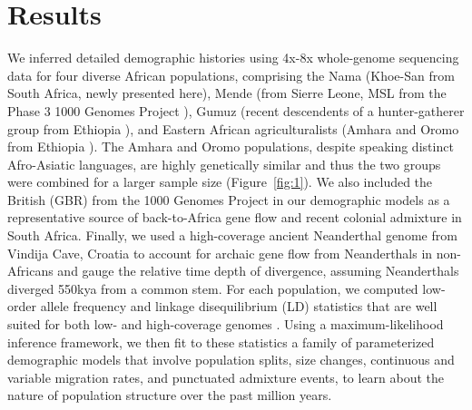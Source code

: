 \documentclass[]{article}
\begin{document}
\section*{Results}

We inferred detailed demographic histories using 4x-8x whole-genome sequencing
data for four diverse African populations, comprising the Nama (Khoe-San from
South Africa, newly presented here), Mende (from Sierre Leone, MSL from the
Phase 3 1000 Genomes Project \citep{1000_Genomes_Project_Consortium2015-zq}),
Gumuz (recent descendents of a hunter-gatherer group from Ethiopia
\citep{Gurdasani2015-qy,Gopalan2019-wd}), and Eastern African agriculturalists
(Amhara and Oromo from Ethiopia \citep{Gurdasani2015-qy}). The Amhara and Oromo
populations, despite speaking distinct Afro-Asiatic languages, are highly
genetically similar \citep{Pagani2015-pz,Gopalan2019-wd} and thus the two
groups were combined for a larger sample size (Figure~\ref{fig:1}). We also
included the British (GBR) from the 1000 Genomes Project in our demographic
models as a representative source of back-to-Africa gene flow and recent
colonial admixture in South Africa. Finally, we used a high-coverage ancient
Neanderthal genome from Vindija Cave, Croatia \citep{Prufer2017-kk} to account
for archaic gene flow from Neanderthals in non-Africans and gauge the relative
time depth of divergence, assuming Neanderthals diverged 550kya from a common
stem. For each population, we computed low-order allele frequency and linkage
disequilibrium (LD) statistics that are well suited for both low- and
high-coverage genomes \citep{Ragsdale2019-nt,Ragsdale2020-nz}. Using a
maximum-likelihood inference framework, we then fit to these statistics a
family of parameterized demographic models that involve population splits, size
changes, continuous and variable migration rates, and punctuated admixture
events, to learn about the nature of population structure over the past million
years.
\end{document}
